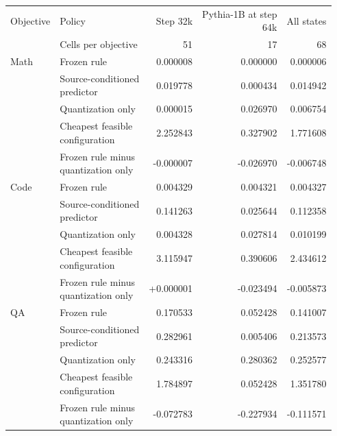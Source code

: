 \begin{table}[!htbp]\normalfont
\centering\small
\setlength{\tabcolsep}{4pt}\renewcommand{\arraystretch}{1.08}
\begin{tabular*}{\textwidth}{@{\extracolsep{\fill}}llrrr@{}}
\toprule
Objective & Policy & Step 32k & \shortstack[l]{Pythia-1B at step\\64k} & All states \\
 & Cells per objective & 51 & 17 & 68 \\
\midrule
Math & Frozen rule & 0.000008 & 0.000000 & 0.000006 \\
 & \shortstack[l]{Source-conditioned\\predictor} & 0.019778 & 0.000434 & 0.014942 \\
 & Quantization only & 0.000015 & 0.026970 & 0.006754 \\
 & \shortstack[l]{Cheapest feasible\\configuration} & 2.252843 & 0.327902 & 1.771608 \\
 & \shortstack[l]{Frozen rule minus\\quantization only} & -0.000007 & -0.026970 & -0.006748 \\
\addlinespace
Code & Frozen rule & 0.004329 & 0.004321 & 0.004327 \\
 & \shortstack[l]{Source-conditioned\\predictor} & 0.141263 & 0.025644 & 0.112358 \\
 & Quantization only & 0.004328 & 0.027814 & 0.010199 \\
 & \shortstack[l]{Cheapest feasible\\configuration} & 3.115947 & 0.390606 & 2.434612 \\
 & \shortstack[l]{Frozen rule minus\\quantization only} & +0.000001 & -0.023494 & -0.005873 \\
\addlinespace
QA & Frozen rule & 0.170533 & 0.052428 & 0.141007 \\
 & \shortstack[l]{Source-conditioned\\predictor} & 0.282961 & 0.005406 & 0.213573 \\
 & Quantization only & 0.243316 & 0.280362 & 0.252577 \\
 & \shortstack[l]{Cheapest feasible\\configuration} & 1.784897 & 0.052428 & 1.351780 \\
 & \shortstack[l]{Frozen rule minus\\quantization only} & -0.072783 & -0.227934 & -0.111571 \\

\end{tabular*}
\end{table}

